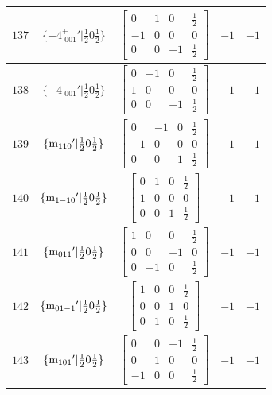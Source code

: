 \documentclass[fleqn,8pt]{jsarticle}
\begin{document}
\begin{longtable}{ccccc}
$ 137 $ & $ \{-4^{+}_{\,\,001}{}'|\frac{1}{2} 0 \frac{1}{2}\} $ & $ \begin{bmatrix} 0 & 1 & 0 & \frac{1}{2} \\ -1 & 0 & 0 & 0 \\ 0 & 0 & -1 & \frac{1}{2} \end{bmatrix} $ & $ -1 $ & $ -1 $ \\ \hline
$ 138 $ & $ \{-4^{-}_{\,\,001}{}'|\frac{1}{2} 0 \frac{1}{2}\} $ & $ \begin{bmatrix} 0 & -1 & 0 & \frac{1}{2} \\ 1 & 0 & 0 & 0 \\ 0 & 0 & -1 & \frac{1}{2} \end{bmatrix} $ & $ -1 $ & $ -1 $ \\ \hline
$ 139 $ & $ \{{\rm m}_{110}{}'|\frac{1}{2} 0 \frac{1}{2}\} $ & $ \begin{bmatrix} 0 & -1 & 0 & \frac{1}{2} \\ -1 & 0 & 0 & 0 \\ 0 & 0 & 1 & \frac{1}{2} \end{bmatrix} $ & $ -1 $ & $ -1 $ \\ \hline
$ 140 $ & $ \{{\rm m}_{1-10}{}'|\frac{1}{2} 0 \frac{1}{2}\} $ & $ \begin{bmatrix} 0 & 1 & 0 & \frac{1}{2} \\ 1 & 0 & 0 & 0 \\ 0 & 0 & 1 & \frac{1}{2} \end{bmatrix} $ & $ -1 $ & $ -1 $ \\ \hline
$ 141 $ & $ \{{\rm m}_{011}{}'|\frac{1}{2} 0 \frac{1}{2}\} $ & $ \begin{bmatrix} 1 & 0 & 0 & \frac{1}{2} \\ 0 & 0 & -1 & 0 \\ 0 & -1 & 0 & \frac{1}{2} \end{bmatrix} $ & $ -1 $ & $ -1 $ \\ \hline
$ 142 $ & $ \{{\rm m}_{01-1}{}'|\frac{1}{2} 0 \frac{1}{2}\} $ & $ \begin{bmatrix} 1 & 0 & 0 & \frac{1}{2} \\ 0 & 0 & 1 & 0 \\ 0 & 1 & 0 & \frac{1}{2} \end{bmatrix} $ & $ -1 $ & $ -1 $ \\ \hline
$ 143 $ & $ \{{\rm m}_{101}{}'|\frac{1}{2} 0 \frac{1}{2}\} $ & $ \begin{bmatrix} 0 & 0 & -1 & \frac{1}{2} \\ 0 & 1 & 0 & 0 \\ -1 & 0 & 0 & \frac{1}{2} \end{bmatrix} $ & $ -1 $ & $ -1 $ \\ \hline

\end{longtable}
\end{document}

